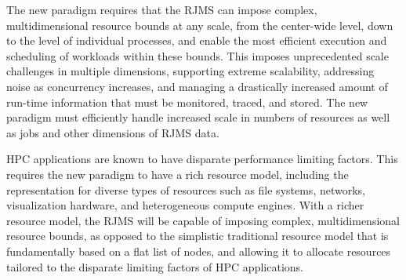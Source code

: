 

The new paradigm requires that the RJMS can impose
complex, multidimensional resource bounds at any scale, 
from the center-wide level, down to the level of individual processes,
and enable the most efficient execution and
scheduling of workloads within these bounds.
This imposes unprecedented scale challenges
in multiple dimensions,
supporting extreme scalability, addressing noise as concurrency
increases, and managing a drastically increased amount of
run-time information that must be monitored, traced, and stored.
The new paradigm must efficiently handle increased scale in
numbers of resources as well as jobs and other dimensions 
of RJMS data.

HPC applications are known to have disparate performance 
limiting factors. This requires
the new paradigm to have a rich resource model, including
the 
representation for diverse
types of resources such as file systems, networks, visualization
hardware, and heterogeneous compute engines.
With a richer resource model, the RJMS will be capable of imposing
complex, multidimensional resource bounds, as opposed to the
simplistic traditional resource model that is fundamentally based on a
flat list of nodes, and allowing it to 
allocate resources tailored to the disparate limiting
factors of HPC applications.  

